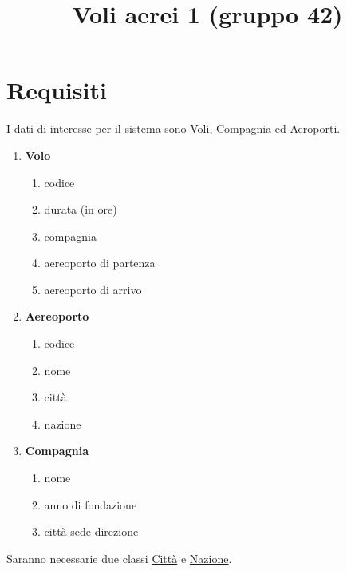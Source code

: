 \documentclass[12pt, letterpaper]{article}
\title{Voli aerei 1 (gruppo 42)}
\date{}
\begin{document}
\maketitle


\section{Requisiti}

I dati di interesse per il sistema sono \underline{Voli}, \underline{Compagnia} ed \underline{Aeroporti}.
\begin{enumerate}
    \item \textbf{Volo}\begin{enumerate}
        \item codice
        \item durata (in ore)
        \item compagnia 
        \item aereoporto di partenza 
        \item aereoporto di arrivo
    \end{enumerate}
    \item \textbf{Aereoporto}\begin{enumerate}
        \item codice 
        \item nome 
        \item città 
        \item nazione
    \end{enumerate}
    \item \textbf{Compagnia}\begin{enumerate}
        \item nome 
        \item anno di fondazione 
        \item città sede direzione
    \end{enumerate}
\end{enumerate}
Saranno necessarie due classi \underline{Città} e \underline{Nazione}.\newpage
\end{document}
